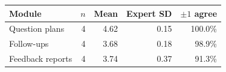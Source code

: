 \begin{center}
\small
\setlength{\tabcolsep}{3.5pt}
\begin{tabular}{@{}lrrrr@{}}
\toprule
\textbf{Module} & \textbf{$n$} & \textbf{Mean} & \textbf{Expert SD} & \textbf{$\pm1$ agree} \\
\midrule
Question plans & 4 & 4.62 & 0.15 & 100.0\% \\
Follow-ups & 4 & 3.68 & 0.18 & 98.9\% \\
Feedback reports & 4 & 3.74 & 0.37 & 91.3\% \\
\bottomrule
\end{tabular}
\captionsetup{hypcap=false}
\label{tab:llm-panel}
\end{center}
